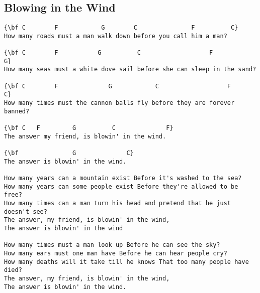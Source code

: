 \documentclass[a4paper]{article}
\begin{document}
\subsection{Blowing in the Wind} %
\label{sub:Blowing in the Wi}
\begin{Verbatim}[commandchars=\\\{\}]
{\bf C        F            G        C               F          C}
How many roads must a man walk down before you call him a man?

{\bf C        F           G          C                   F            G}
How many seas must a white dove sail before she can sleep in the sand?

{\bf C        F              G            C                   F       C}
How many times must the cannon balls fly before they are forever banned?

{\bf C   F         G          C              F}
The answer my friend, is blowin' in the wind.

{\bf               G              C}
The answer is blowin' in the wind.

How many years can a mountain exist Before it's washed to the sea?
How many years can some people exist Before they're allowed to be free?
How many times can a man turn his head and pretend that he just doesn't see?
The answer, my friend, is blowin' in the wind,
The answer is blowin' in the wind

How many times must a man look up Before he can see the sky?
How many ears must one man have Before he can hear people cry?
How many deaths will it take till he knows That too many people have died?
The answer, my friend, is blowin' in the wind,
The answer is blowin' in the wind.
\end{Verbatim}
\newpage
\end{document}
